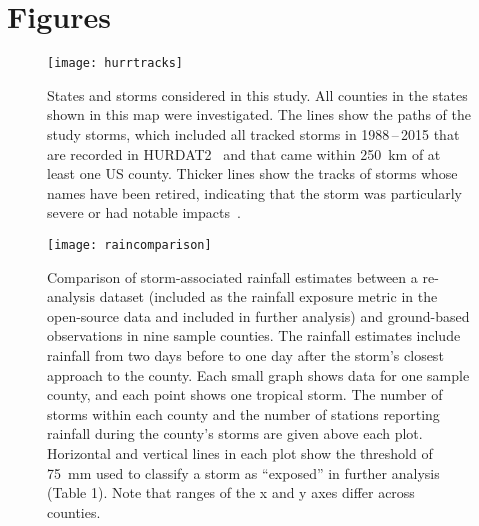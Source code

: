 \section*{Figures}

\listoffigures

\clearpage

\begin{figure}[tbhp!] \centering
\texttt{[image: hurrtracks]}
\caption{States and storms considered in this study. All counties in the states
	shown in this map were investigated. The lines show the paths of the
	study storms, which included all tracked storms in 1988\,--\,2015 that
	are recorded in \ac{HURDAT2}~\parencite{landsea2013} and that came
	within 250~\si{\kilo\metre} of at least one \ac{US} county. Thicker
	lines show the tracks of storms whose names have been retired,
	indicating that the storm was particularly severe or had notable
	impacts~\parencite{retirednames}.  }
\label{fig:hurrtracks}
\end{figure}

\clearpage

\begin{figure}[tbhp!] \centering
\texttt{[image: raincomparison]} 
	\caption{Comparison of storm-associated rainfall estimates between 
	a re-analysis dataset (included as the rainfall exposure metric
	in the open-source data and included in further analysis) and ground-based
	observations in nine sample counties. The rainfall estimates  
	include rainfall from two days before to one day after the storm's closest
	approach to the county. Each small graph shows data for one sample county, 
	and each point shows one tropical storm. The number of storms 
	within each county and the number of stations reporting rainfall during 
	the county's storms are given above each plot. Horizontal and vertical lines 
	in each plot show the threshold of 75~\si{\milli\metre} used to classify a storm 
	as ``exposed'' in further analysis (Table 1). Note that 
	ranges of the x and y axes differ across counties.
	} 
\label{fig:raincomparison}
\end{figure}

